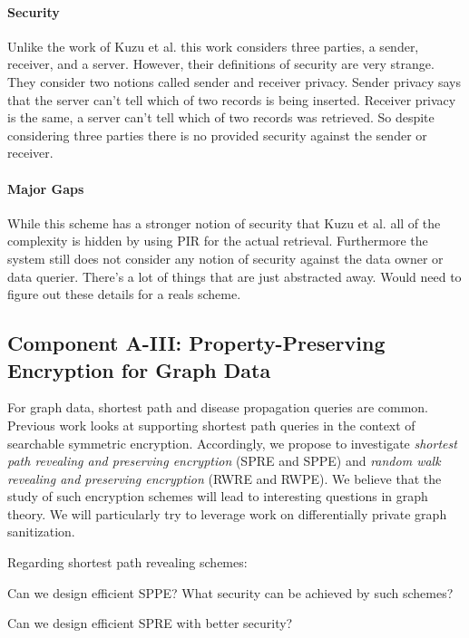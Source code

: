 \paragraph{Security} Unlike the work of Kuzu et al. this work considers three parties, a sender, receiver, and a server.  However, their definitions of security are very strange.  They consider two notions called sender and receiver privacy.  Sender privacy says that the server can't tell which of two records is being inserted.  Receiver privacy is the same, a server can't tell which of two records was retrieved.  So despite considering three parties there is no provided security against the sender or receiver.

\paragraph{Major Gaps}  While this scheme has a stronger notion of security that Kuzu et al. all of the complexity is hidden by using PIR for the actual retrieval.  Furthermore the system still does not consider any notion of security against the data owner or data querier.  There's a lot of things that are just abstracted away.  Would need to figure out these details for a reals scheme.

\subsection{Component A-III:  Property-Preserving Encryption for Graph Data} 

For graph data, shortest path and disease propagation queries are common.  Previous work looks at supporting shortest path queries in the context of searchable symmetric encryption.  Accordingly, we propose to investigate \emph{shortest path revealing  and preserving encryption} (SPRE and SPPE) and \emph{random walk revealing and preserving encryption} (RWRE and RWPE).   We believe that the study of such encryption schemes will lead to interesting questions in graph theory.  We will particularly try to leverage work on differentially private graph sanitization. 

Regarding shortest path revealing schemes: 

\begin{question}
Can we design efficient SPPE?  What security can be achieved by such schemes?
\end{question}


\begin{question}
Can we design efficient SPRE with better security?
\end{question}

